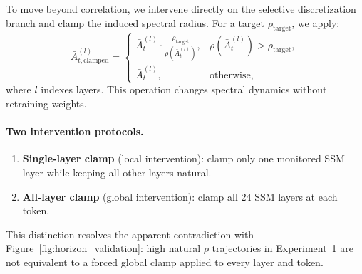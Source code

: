 \documentclass[10pt,twocolumn]{article}
\begin{document}
To move beyond correlation, we intervene directly on the selective discretization branch and clamp the induced spectral radius. For a target $\rho_{\text{target}}$, we apply:
\begin{equation}
\bar{A}^{(l)}_{t,\text{clamped}} =
\begin{cases}
\bar{A}^{(l)}_t \cdot \frac{\rho_{\text{target}}}{\rho(\bar{A}^{(l)}_t)}, & \rho(\bar{A}^{(l)}_t) > \rho_{\text{target}}, \\
\bar{A}^{(l)}_t, & \text{otherwise},
\end{cases}
\label{eq:causal_clamp}
\end{equation}
where $l$ indexes layers. This operation changes spectral dynamics without retraining weights.

\paragraph{Two intervention protocols.}
\begin{enumerate}
\item \textbf{Single-layer clamp} (local intervention): clamp only one monitored SSM layer while keeping all other layers natural.
\item \textbf{All-layer clamp} (global intervention): clamp all 24 SSM layers at each token.
\end{enumerate}

This distinction resolves the apparent contradiction with Figure~\ref{fig:horizon_validation}: high natural $\rho$ trajectories in Experiment~1 are not equivalent to a forced global clamp applied to every layer and token.
\end{document}
